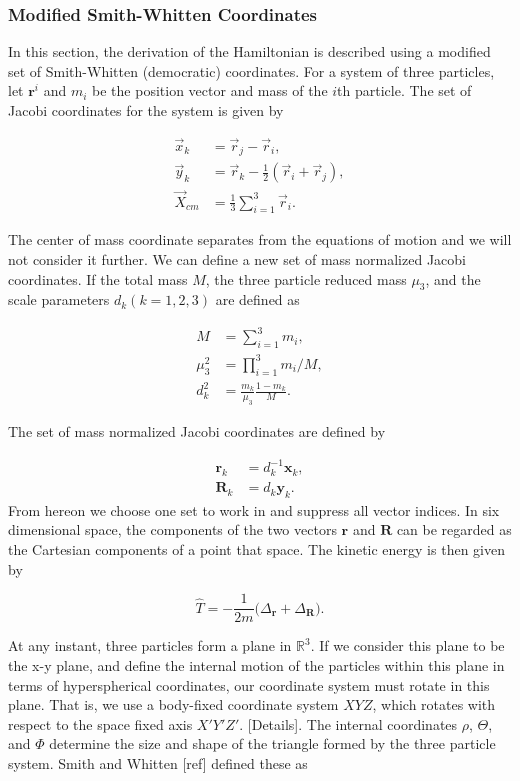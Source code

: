 \documentclass{article}
\begin{document}
\subsubsection{Modified Smith-Whitten Coordinates}
In this section, the derivation of the Hamiltonian is described using a modified set of Smith-Whitten (democratic) coordinates.
For a system of three particles, let $\bm{r}^i$ and $m_i$ be the position vector and mass of the $i$th particle. The set of Jacobi coordinates for the system is given by

\begin{subequations}
	\begin{align}
	\vec{x}_k 		&= \vec{r}_j - \vec{r}_i,\\
	\vec{y}_k 		&= \vec{r}_k - \frac{1}{2}(\vec{r}_i + \vec{r}_j),\\
	\vec{X}_{cm} 	&= \frac{1}{3} \sum_{i=1}^{3}\vec{r}_i.
	\end{align}
\end{subequations}

The center of mass coordinate separates from the equations of motion and we will not consider it further. We can define a new set of mass normalized Jacobi coordinates. If the total mass $M$, the three particle reduced mass $\mu_3$, and the scale parameters $d_k (k=1,2,3)$ are defined as 

\begin{align}
M &= \sum_{i=1}^{3}m_i,\\
\mu_3^2 &= \prod_{i=1}^{3}m_i/M,\\
d_k^2 &= \frac{m_k}{\mu_3}\frac{1-m_k}{M}. 
\end{align}

The set of mass normalized Jacobi coordinates are defined by

\begin{align}
\bm{r}_k &= d^{-1}_k\bm{x}_k,\\
\bm{R}_k &= d_k\bm{y}_k.  
\end{align}
From hereon we choose one set to work in and suppress all vector indices. In six dimensional space, the components of the two vectors $\bm{r}$ and $\bm{R}$ can be regarded as the Cartesian components of a point that space. The kinetic energy is then given by

\begin{equation}
\hat{T} = -\frac{1}{2m}\Big(\Delta_{\bm{r}}+\Delta_{\bm{R}}\Big).
\end{equation} 

At any instant, three particles form a plane in $\mathbb{R}^3$. If we consider this plane to be the x-y plane, and define the internal motion of the particles within this plane in terms of  hyperspherical coordinates, our coordinate system must rotate in this plane. That is, we use a body-fixed coordinate system $XYZ$, which rotates with respect to the space fixed axis $X'Y'Z'$. [Details]. The internal coordinates $\rho$, $\Theta$, and $\Phi$ determine the size and shape of the triangle formed by the three particle system. Smith and Whitten [ref] defined these as   
\end{document}
